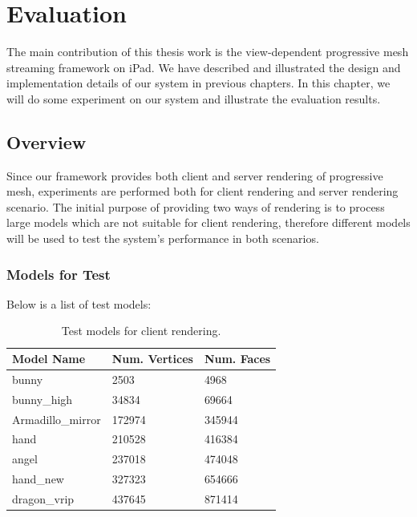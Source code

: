 \chapter{Evaluation}
\label{chapter:result}
The main contribution of this thesis work is the view-dependent progressive mesh streaming framework on iPad. We have described and illustrated the design and implementation details of our system in previous chapters. In this chapter, we will do some experiment on our system and illustrate the evaluation results.  

\section{Overview}
\label{chapter:result:overview}
Since our framework provides both client and server rendering of progressive mesh, experiments are performed both for client rendering and server rendering scenario. The initial purpose of providing two ways of rendering is to process large models which are not suitable for client rendering, therefore different models will be used to test the system's performance in both scenarios. 
\subsection{Models for Test}
\label{chapter:result:overview:modelfortest}
Below is a list of test models: 
\begin{table}
\begin{center}
    \begin{tabular}{|	p{7.5cm}	|	l	|	l	|}
    \hline
    	\textbf{Model Name} 							& \textbf{Num. Vertices} 	& \textbf{Num. Faces}	\\ \hline
	bunny								&2503			&4968		\\ \hline
	bunny\_high							&34834			&69664		\\ \hline
	Armadillo\_mirror						&172974			&345944		\\ \hline
	hand									&210528			&416384		\\ \hline
	angel								&237018			&474048		\\ \hline
	hand\_new							&327323			&654666		\\ \hline
	dragon\_vrip							&437645			&871414		\\ \hline
    \end{tabular}
    \caption{Test models for client rendering.}
    \label{table:modelsclientrendering}
\end{center}
\end{table}

